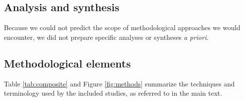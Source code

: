 \documentclass[sn-mathphys,Numbered,pdflatex]{sn-jnl}
\theoremstyle{remark}
\theoremstyle{definition}
\begin{document}
\subsection*{Analysis and synthesis}\label{analysis-and-synthesis}

Because we could not predict the scope of methodological approaches we
would encounter, we did not prepare specific analyses or syntheses
\emph{a priori}.

\subsection*{Methodological elements}\label{methodological-elements}

Table \ref{tab:composite} and Figure \ref{fig:methods} summarize the
techniques and terminology used by the included studies, as referred to
in the main text.

\small
\end{document}
